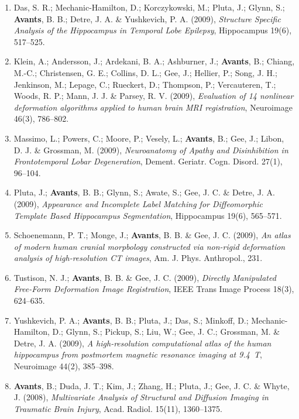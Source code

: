 \documentclass[11pt]{moderncv} %
\begin{document}
\begin{enumerate}
\item  Das, S. R.; Mechanic-Hamilton, D.; Korczykowski, M.; Pluta, J.; Glynn, S.; \textbf{Avants}, B. B.; Detre, J. A. \&  Yushkevich, P. A. (2009), \textit{Structure Specific Analysis of the Hippocampus in Temporal Lobe Epilepsy}, Hippocampus 19(6), 517--525.

\item  Klein, A.; Andersson, J.; Ardekani, B. A.; Ashburner, J.; \textbf{Avants}, B.; Chiang, M.-C.; Christensen, G. E.; Collins, D. L.; Gee, J.; Hellier, P.; Song, J. H.; Jenkinson, M.; Lepage, C.; Rueckert, D.; Thompson, P.; Vercauteren, T.; Woods, R. P.; Mann, J. J. \&  Parsey, R. V. (2009), \textit{Evaluation of 14 nonlinear deformation algorithms applied to human brain MRI registration}, Neuroimage 46(3), 786--802.

\item  Massimo, L.; Powers, C.; Moore, P.; Vesely, L.; \textbf{Avants}, B.; Gee, J.; Libon, D. J. \&  Grossman, M. (2009), \textit{Neuroanatomy of Apathy and Disinhibition in Frontotemporal Lobar Degeneration}, Dement. Geriatr. Cogn. Disord. 27(1), 96--104.

\item  Pluta, J.; \textbf{Avants}, B. B.; Glynn, S.; Awate, S.; Gee, J. C. \&  Detre, J. A. (2009), \textit{Appearance and Incomplete Label Matching for Diffeomorphic Template Based Hippocampus Segmentation}, Hippocampus 19(6), 565--571.

\item  Schoenemann, P. T.; Monge, J.; \textbf{Avants}, B. B. \&  Gee, J. C. (2009), \textit{An atlas of modern human cranial morpbology constructed via non-rigid deformation analysis of high-resolution CT images}, Am. J. Phys. Anthropol., 231.

\item  Tustison, N. J.; \textbf{Avants}, B. B. \&  Gee, J. C. (2009), \textit{Directly Manipulated Free-Form Deformation Image Registration}, IEEE Trans Image Process 18(3), 624--635.

\item  Yushkevich, P. A.; \textbf{Avants}, B. B.; Pluta, J.; Das, S.; Minkoff, D.; Mechanic-Hamilton, D.; Glynn, S.; Pickup, S.; Liu, W.; Gee, J. C.; Grossman, M. \&  Detre, J. A. (2009), \textit{A high-resolution computational atlas of the human hippocampus from postmortem magnetic resonance imaging at 9.4~T}, Neuroimage 44(2), 385--398.

\item  \textbf{Avants}, B.; Duda, J. T.; Kim, J.; Zhang, H.; Pluta, J.; Gee, J. C. \&  Whyte, J. (2008), \textit{Multivariate Analysis of Structural and Diffusion Imaging in Traumatic Brain Injury}, Acad. Radiol. 15(11), 1360--1375.


\end{enumerate}
\end{document}
